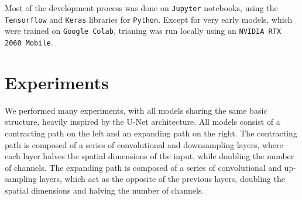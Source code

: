 \documentclass[11pt]{article}
\begin{document}
\begin{multicols}{2}


      Most of the development process was done on \texttt{Jupyter} notebooks, using the \texttt{Tensorflow}\cite{TensorFlow} and \texttt{Keras}\cite{chollet2015keras} libraries for \texttt{Python}. Except for very early models, which were trained on \texttt{Google Colab}, trianing was run locally using an \texttt{NVIDIA RTX 2060 Mobile}.

      \label{sec:experiments}
      \section{Experiments}
      We performed many experiments, with all models sharing the same basic structure, heavily inspired by the U-Net\cite{ronneberger2015unetconvolutionalnetworksbiomedical} architecture. All models consist of a contracting path on the left and an expanding path on the right. The contracting path is composed of a series of convolutional and downsampling layers, where each layer halves the spatial dimensions of the input, while doubling the number of channels. The expanding path is composed of a series of convolutional and up-sampling layers, which act as the opposite of the previous layers, doubling the spatial dimensions and halving the number of channels.


\end{multicols}
\end{document}
